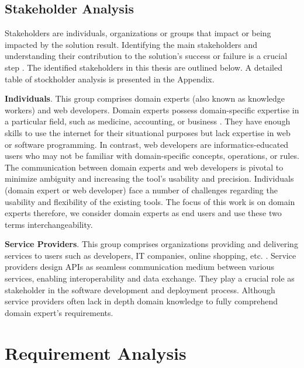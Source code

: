 \vspace{-10pt}
\hypertarget{sec:stakeholder-analysis}{%
\subsection{Stakeholder Analysis }\label{sec:stakeholder-analysis}}
\vspace{10pt}

Stakeholders are individuals, organizations or groups that impact or being impacted by the solution result. Identifying the main stakeholders and understanding their contribution to the solution’s success or failure is a crucial step \autocite{Brugha2000}. The identified stakeholders in this thesis are outlined below. A detailed table of stockholder analysis is presented in the Appendix.

\textbf{Individuals}. This group comprises domain experts (also known as
knowledge workers) and web developers. Domain experts possess
domain-specific expertise in a particular field, such as medicine,
accounting, or business \autocite{Chemnitz2017}. They have enough
skills to use the internet for their situational purposes but lack
expertise in web or software programming. In contrast, web developers
are informatics-educated users who may not be familiar with
domain-specific concepts, operations, or rules. The communication
between domain experts and web developers is pivotal to minimize
ambiguity and increasing the tool's usability and precision. Individuals
(domain expert or web developer) face a number of challenges regarding
the usability and flexibility of the existing tools. The focus of this
work is on domain experts therefore, we consider domain experts as end
users and use these two terms interchangeability.

\textbf{Service Providers}. This group comprises organizations providing
and delivering services to users such as developers, IT companies,
online shopping, etc. \autocite{Chemnitz2017}. Service providers
design APIs as seamless communication medium between various services,
enabling interoperability and data exchange. They play a crucial role as
stakeholder in the software development and deployment process. Although
service providers often lack in depth domain knowledge to fully
comprehend domain expert's requirements.

\vspace{-15pt}
\hypertarget{sec:requirements}{%
\section{Requirement Analysis}\label{sec:requirements}}
\vspace{15pt}

